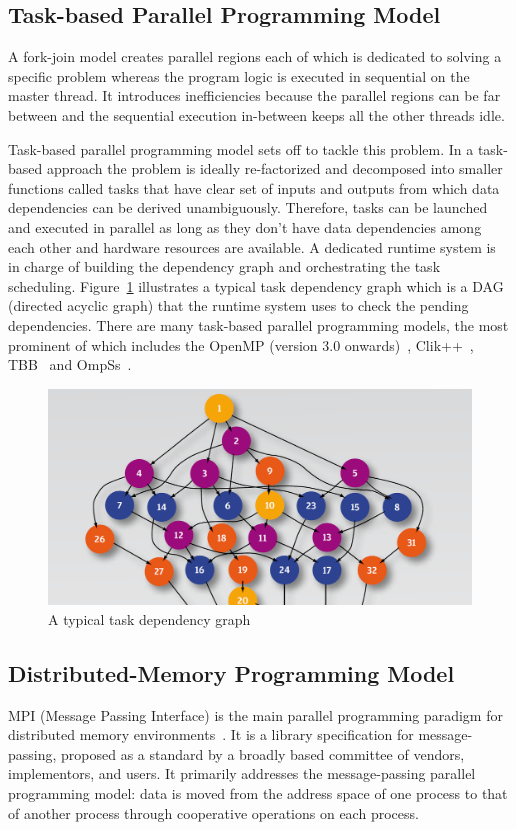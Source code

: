 \subsection{Task-based Parallel Programming Model}
A fork-join model creates parallel regions each of which is dedicated to solving 
a specific problem whereas the program logic is executed in sequential on the 
master thread. It introduces inefficiencies because the parallel regions can be 
far between and the sequential execution in-between keeps all the other threads 
idle. 

Task-based parallel programming model sets off to tackle this problem. In a 
task-based approach the problem is ideally re-factorized and decomposed into 
smaller functions called tasks that have clear set of inputs and outputs from 
which data dependencies can be derived unambiguously. Therefore, tasks can be 
launched and executed in parallel as long as they don't have data dependencies 
among each other and hardware resources are available. A dedicated runtime 
system is in charge of building the dependency graph and orchestrating the task 
scheduling. Figure~\ref{fig:task-dependency} illustrates a typical task 
dependency graph which is a DAG (directed acyclic graph) that the runtime system 
uses to check the pending dependencies. There are many task-based parallel 
programming models, the most prominent of which includes the OpenMP (version 3.0 
onwards)~\cite{OpenMP4.0}, Clik++~\cite{clik}, TBB~\cite{tbb} and 
OmpSs~\cite{ompss}.

\begin{figure}[H]
    \centerline{\includegraphics[scale=0.50]{background/figs/starss.png}}
    \caption{A typical task dependency graph}
    \label{fig:task-dependency}
\end{figure}

\subsection{Distributed-Memory Programming Model}
MPI (Message Passing Interface) is the main parallel programming paradigm for 
distributed memory environments~\cite{llnl_mpi}. It is a library specification for 
message-passing, proposed as a standard by a broadly based committee of vendors, 
implementors, and users. It primarily addresses the message-passing parallel 
programming model: data is moved from the address space of one process to that 
of another process through cooperative operations on each 
process.

